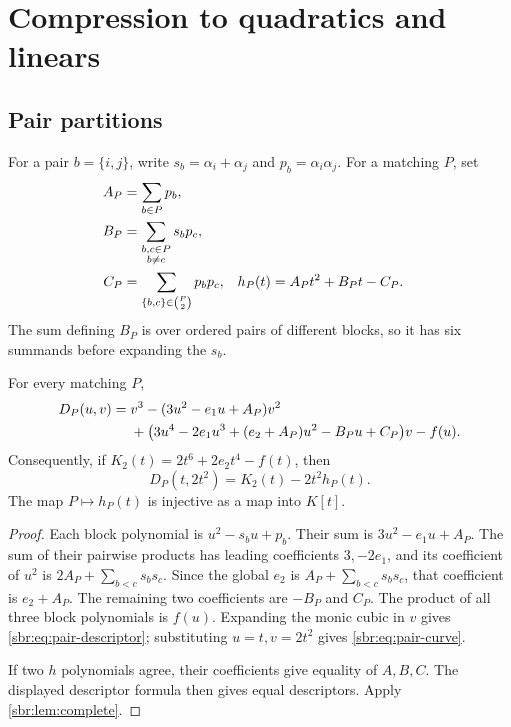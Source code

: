 \documentclass[11pt,letterpaper]{article}
\numberwithin{equation}{section}
\theoremstyle{definition}
\theoremstyle{remark}
\begin{document}
\section{Compression to quadratics and linears}
\label{sbr:sec:compression}

\subsection{Pair partitions}

For a pair $b=\{i,j\}$, write
$s_b=\alpha_i+\alpha_j$ and $p_b=\alpha_i\alpha_j$. For a matching $P$, set
\begin{align}
 A_P&=\sum_{b\in P}p_b,\notag\\
 B_P&=\sum_{\substack{b,c\in P\\b\ne c}}s_b p_c,\notag\\
 C_P&=\sum_{\{b,c\}\in\binom P2}p_b p_c,
 &h_P(t)&=A_Pt^2+B_Pt-C_P.
 \label{sbr:eq:h}
\end{align}
The sum defining $B_P$ is over ordered pairs of different blocks, so it has
six summands before expanding the $s_b$.

\begin{proposition}
\label{sbr:prop:pair-expansion}
For every matching $P$,
\begin{align}
 D_P(u,v)={}&v^3-(3u^2-e_1u+A_P)v^2\notag\\
 &+\bigl(3u^4-2e_1u^3+(e_2+A_P)u^2-B_Pu+C_P\bigr)v-f(u).
 \label{sbr:eq:pair-descriptor}
\end{align}
Consequently, if $K_2(t)=2t^6+2e_2t^4-f(t)$, then
\begin{equation}
 D_P(t,2t^2)=K_2(t)-2t^2h_P(t).
 \label{sbr:eq:pair-curve}
\end{equation}
The map $P\mapsto h_P(t)$ is injective as a map into $K[t]$.
\end{proposition}
\begin{proof}
Each block polynomial is $u^2-s_bu+p_b$. Their sum is
$3u^2-e_1u+A_P$. The sum of their pairwise products has leading coefficients
$3,-2e_1$, and its coefficient of $u^2$ is
$2A_P+\sum_{b<c}s_bs_c$. Since the global $e_2$ is
$A_P+\sum_{b<c}s_bs_c$, that coefficient is $e_2+A_P$.
The remaining two coefficients are $-B_P$ and $C_P$. The product of all
three block polynomials is $f(u)$. Expanding the monic cubic in $v$ gives
\cref{sbr:eq:pair-descriptor}; substituting $u=t,v=2t^2$ gives
\cref{sbr:eq:pair-curve}.

If two $h$ polynomials agree, their coefficients give equality of $A,B,C$.
The displayed descriptor formula then gives equal descriptors. Apply
\cref{sbr:lem:complete}.
\end{proof}
\end{document}
